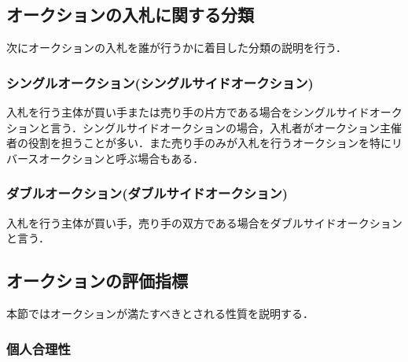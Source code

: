 \hypertarget{ux30aaux30fcux30afux30b7ux30e7ux30f3ux306eux5165ux672dux306bux95a2ux3059ux308bux5206ux985e}{%
\subsection{オークションの入札に関する分類}\label{ux30aaux30fcux30afux30b7ux30e7ux30f3ux306eux5165ux672dux306bux95a2ux3059ux308bux5206ux985e}}

次にオークションの入札を誰が行うかに着目した分類の説明を行う\cite{yokoo}．

\hypertarget{ux30b7ux30f3ux30b0ux30ebux30aaux30fcux30afux30b7ux30e7ux30f3ux30b7ux30f3ux30b0ux30ebux30b5ux30a4ux30c9ux30aaux30fcux30afux30b7ux30e7ux30f3}{%
\subsubsection{シングルオークション(シングルサイドオークション)}\label{ux30b7ux30f3ux30b0ux30ebux30aaux30fcux30afux30b7ux30e7ux30f3ux30b7ux30f3ux30b0ux30ebux30b5ux30a4ux30c9ux30aaux30fcux30afux30b7ux30e7ux30f3}}

入札を行う主体が買い手または売り手の片方である場合をシングルサイドオークションと言う．シングルサイドオークションの場合，入札者がオークション主催者の役割を担うことが多い．また売り手のみが入札を行うオークションを特にリバースオークションと呼ぶ場合もある．

\hypertarget{ux30c0ux30d6ux30ebux30aaux30fcux30afux30b7ux30e7ux30f3ux30c0ux30d6ux30ebux30b5ux30a4ux30c9ux30aaux30fcux30afux30b7ux30e7ux30f3}{%
\subsubsection{ダブルオークション(ダブルサイドオークション)}\label{ux30c0ux30d6ux30ebux30aaux30fcux30afux30b7ux30e7ux30f3ux30c0ux30d6ux30ebux30b5ux30a4ux30c9ux30aaux30fcux30afux30b7ux30e7ux30f3}}

入札を行う主体が買い手，売り手の双方である場合をダブルサイドオークションと言う．

\hypertarget{ux30aaux30fcux30afux30b7ux30e7ux30f3ux306eux8a55ux4fa1ux6307ux6a19}{%
\subsection{オークションの評価指標}\label{ux30aaux30fcux30afux30b7ux30e7ux30f3ux306eux8a55ux4fa1ux6307ux6a19}}

本節ではオークションが満たすべきとされる性質を説明する．

\hypertarget{ux500bux4ebaux5408ux7406ux6027}{%
\subsubsection{個人合理性}\label{ux500bux4ebaux5408ux7406ux6027}}

